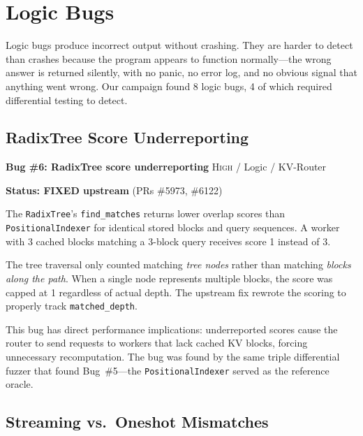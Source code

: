\section{Logic Bugs}
\label{sec:findings:logic}

Logic bugs produce incorrect output without crashing. They are harder to detect than crashes because the program appears to function normally---the wrong answer is returned silently, with no panic, no error log, and no obvious signal that anything went wrong. Our campaign found 8 logic bugs, 4 of which required differential testing to detect.

\subsection{RadixTree Score Underreporting}

\begin{bugbox}
\textbf{Bug \#6: RadixTree score underreporting} \hfill \textsc{High} / Logic / KV-Router

\textbf{Status: FIXED upstream} (PRs \#5973, \#6122)

\medskip
The \texttt{RadixTree}'s \texttt{find\_matches} returns lower overlap scores than \texttt{PositionalIndexer} for identical stored blocks and query sequences. A worker with 3 cached blocks matching a 3-block query receives score 1 instead of 3.

\medskip
The tree traversal only counted matching \emph{tree nodes} rather than matching \emph{blocks along the path}. When a single node represents multiple blocks, the score was capped at 1 regardless of actual depth. The upstream fix rewrote the scoring to properly track \texttt{matched\_depth}.
\end{bugbox}

%
This bug has direct performance implications: underreported scores cause the router to send requests to workers that lack cached KV blocks, forcing unnecessary recomputation. The bug was found by the same triple differential fuzzer that found Bug~\#5---the \texttt{PositionalIndexer} served as the reference oracle.

\subsection{Streaming vs.\ Oneshot Mismatches}

